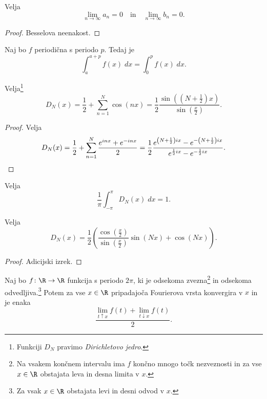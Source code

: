 \begin{lema}
Velja
\[
\lim_{n \to \infty} a_n = 0
\quad \text{in} \quad
\lim_{n \to \infty} b_n = 0.
\]
\end{lema}

\begin{proof}
Besselova neenakost.
\end{proof}

\begin{lema}
Naj bo $f$ periodična s periodo $p$. Tedaj je
\[
\int_a^{a+p} f(x)\;dx = \int_0^p f(x)\;dx.
\]
\end{lema}

\obvs

\begin{lema}
Velja\footnote{Funkciji $D_N$ pravimo
\emph{Dirichletovo jedro}.}
\[
D_N(x) =
\frac{1}{2} + \sum_{n=1}^N \cos(nx) =
\frac{1}{2} \frac{\sin\left(\left(N + \frac{1}{2}\right)x\right)}
{\sin\left(\frac{x}{2}\right)}.
\]
\end{lema}

\begin{proof}
Velja
\[
D_N(x) =
\frac{1}{2} + \sum_{n=1}^N \frac{e^{inx} + e^{-inx}}{2} =
\frac{1}{2} \frac{
e^{\left(N+\frac{1}{2}\right)ix}-e^{-\left(N+\frac{1}{2}\right)ix}}
{e^{\frac{1}{2}ix}-e^{-\frac{1}{2}ix}}. \qedhere
\]
\end{proof}

\begin{lema}
Velja
\[
\frac{1}{\pi} \int_{-\pi}^\pi D_N(x)\;dx = 1.
\]
\end{lema}

\obvs

\begin{lema}
Velja
\[
D_N(x) =
\frac{1}{2} \left(
\frac{\cos\left(\frac{x}{2}\right)}{\sin\left(\frac{x}{2}\right)}
\sin(Nx) + \cos(Nx)\right).
\]
\end{lema}

\begin{proof}
Adicijski izrek.
\end{proof}

\begin{izrek}
Naj bo $f \colon \R \to \R$ funkcija s periodo $2\pi$, ki je
odsekoma zvezna\footnote{Na vsakem končnem intervalu ima $f$ končno
mnogo točk nezveznosti in za vse $x \in \R$ obstajata leva in desna
limita v $x$.} in odsekoma odvedljiva.\footnote{Za vsak $x \in \R$
obstajata levi in desni odvod v $x$.} Potem za vse $x \in \R$
pripadajoča Fourierova vrsta konvergira v $x$ in je enaka
\[
\frac{\displaystyle
\lim_{t \uparrow x} f(t) + \lim_{t \downarrow x} f(t)}{2}.
\]
\end{izrek}

